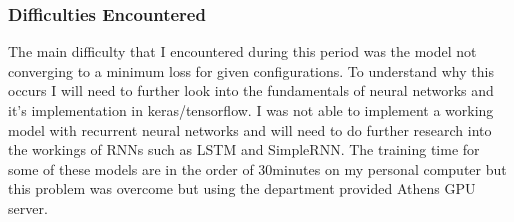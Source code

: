 \subsubsection{Difficulties Encountered}
    
    The main difficulty that I encountered during this period was the model not converging to a minimum loss for given configurations. To understand why this occurs I will need to further look into the fundamentals of neural networks and it's implementation in keras/tensorflow. I was not able to implement a working model with recurrent neural networks and will need to do further research into the workings of RNNs such as LSTM and SimpleRNN. The training time for some of these models are in the order of 30minutes on my personal computer but this problem was overcome but using the department provided Athens GPU server. 